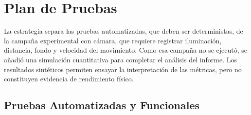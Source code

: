 \section{Plan de Pruebas}
\label{sec:plan_pruebas}

La estrategia separa las pruebas automatizadas, que deben ser deterministas,
de la campaña experimental con cámara, que requiere registrar iluminación,
distancia, fondo y velocidad del movimiento. Como esa campaña no se ejecutó,
se añadió una simulación cuantitativa para completar el análisis del informe.
Los resultados sintéticos permiten ensayar la interpretación de las métricas,
pero no constituyen evidencia de rendimiento físico.

\subsection{Pruebas Automatizadas y Funcionales}
\label{subsec:pruebas_funcionales}

